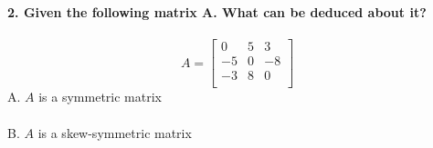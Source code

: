 \documentclass[prl,twocolumn,showpacs,preprintnumbers,superscriptaddress]{revtex4}
\theoremstyle{plain}
\theoremstyle{definition}
\begin{document}
\begin{widetext}
\textbf{2. Given the following matrix A. What can be deduced about it?}
\\
\\
\[ A = 
\begin{bmatrix}    0 & 5 & 3 \\     -5 & 0 & -8 \\ -3 & 8 & 0  \\ \end{bmatrix} \]
A. $A$ is a symmetric matrix
\\
\\
B. $A$ is a skew-symmetric matrix
\\

\end{widetext}
\end{document}
